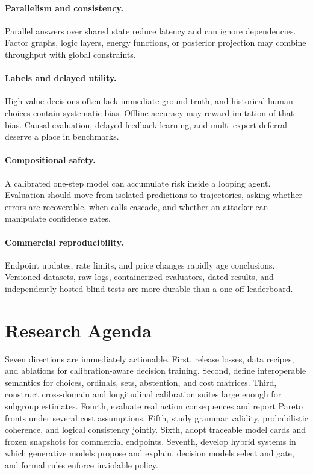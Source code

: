 \documentclass[11pt]{article}
\begin{document}
\paragraph{Parallelism and consistency.} Parallel answers over shared state reduce latency and can ignore dependencies. Factor graphs, logic layers, energy functions, or posterior projection may combine throughput with global constraints.

\paragraph{Labels and delayed utility.} High-value decisions often lack immediate ground truth, and historical human choices contain systematic bias. Offline accuracy may reward imitation of that bias. Causal evaluation, delayed-feedback learning, and multi-expert deferral deserve a place in benchmarks.

\paragraph{Compositional safety.} A calibrated one-step model can accumulate risk inside a looping agent. Evaluation should move from isolated predictions to trajectories, asking whether errors are recoverable, when calls cascade, and whether an attacker can manipulate confidence gates.

\paragraph{Commercial reproducibility.} Endpoint updates, rate limits, and price changes rapidly age conclusions. Versioned datasets, raw logs, containerized evaluators, dated results, and independently hosted blind tests are more durable than a one-off leaderboard.

\section{Research Agenda}

Seven directions are immediately actionable. First, release losses, data recipes, and ablations for calibration-aware decision training. Second, define interoperable semantics for choices, ordinals, sets, abstention, and cost matrices. Third, construct cross-domain and longitudinal calibration suites large enough for subgroup estimates. Fourth, evaluate real action consequences and report Pareto fronts under several cost assumptions. Fifth, study grammar validity, probabilistic coherence, and logical consistency jointly. Sixth, adopt traceable model cards and frozen snapshots for commercial endpoints. Seventh, develop hybrid systems in which generative models propose and explain, decision models select and gate, and formal rules enforce inviolable policy.
\end{document}
